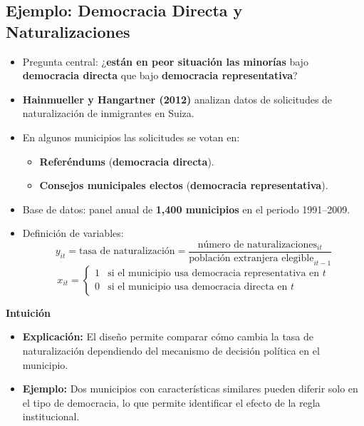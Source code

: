 \documentclass[12pt]{article}
\begin{document}
\subsection*{\noindent\textbf{Ejemplo: Democracia Directa y Naturalizaciones}}

\begin{itemize}
    \item Pregunta central: ¿\textbf{están en peor situación las minorías} bajo \textbf{democracia directa} que bajo \textbf{democracia representativa}?
    
    \item \textbf{Hainmueller y Hangartner (2012)} analizan datos de solicitudes de naturalización de inmigrantes en Suiza.
    
    \item En algunos municipios las solicitudes se votan en:
    \begin{itemize}
        \item \textbf{Referéndums} (\textbf{democracia directa}).
        \item \textbf{Consejos municipales electos} (\textbf{democracia representativa}).
    \end{itemize}
    
    \item Base de datos: panel anual de \textbf{1,400 municipios} en el periodo 1991–2009.
    
    \item Definición de variables:
    \[
    y_{it} = \text{tasa de naturalización} 
    = \frac{\text{número de naturalizaciones}_{it}}{\text{población extranjera elegible}_{it-1}}
    \]
    \[
    x_{it} =
    \begin{cases}
        1 & \text{si el municipio usa democracia representativa en } t \\
        0 & \text{si el municipio usa democracia directa en } t
    \end{cases}
    \]
\end{itemize}

\noindent\textbf{Intuición}
\begin{itemize}
    \item \textbf{Explicación:} El diseño permite comparar cómo cambia la tasa de naturalización dependiendo del mecanismo de decisión política en el municipio.
    \item \textbf{Ejemplo:} Dos municipios con características similares pueden diferir solo en el tipo de democracia, lo que permite identificar el efecto de la regla institucional.
\end{itemize}
\end{document}
